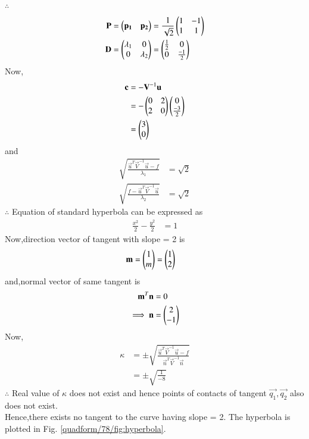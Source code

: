 $\therefore$
\begin{align}
    \mathbf{P} &= \begin{pmatrix}\mathbf{p_1} & \mathbf{p_2}\end{pmatrix} = \frac{1}{\sqrt{2}}\begin{pmatrix}1 & -1 \\ 1 & 1\end{pmatrix}
    \\
    \mathbf{D} &= \begin{pmatrix}\lambda_1 & 0 \\ 0 & \lambda_2\end{pmatrix} = \begin{pmatrix}\frac{1}{2} & 0 \\ 0 & \frac{-1}{2}\end{pmatrix}
\end{align}
Now,
\begin{align}
    \mathbf{c} &= -\mathbf{V}^{-1}\mathbf{u} 
    \\
    &= -\begin{pmatrix}0 & 2 \\2 & 0\end{pmatrix}\begin{pmatrix}0 \\ \frac{-3}{2}\end{pmatrix}
    \\
    &= \begin{pmatrix}3 \\ 0\end{pmatrix}
\end{align}
and
\begin{align}
    \sqrt{\frac{ \vec{u}^T\vec{V}^{-1}\vec{u} - f}{\lambda_1}} &= \sqrt{2}
    \\
    \sqrt{ \frac{f- \vec{u}^T\vec{V}^{-1}\vec{u}}{\lambda_2}} &= \sqrt{2}
\end{align}
$\therefore$ Equation of standard hyperbola can be expressed as 
\begin{align}
    \frac{x^2}{2} - \frac{y^2}{2} &= 1
\end{align}
Now,direction vector of tangent with slope = 2 is
\begin{align}
    \mathbf{m} &= \begin{pmatrix}1 \\ m\end{pmatrix} = \begin{pmatrix}1 \\ 2\end{pmatrix}
\end{align}
and,normal vector of same tangent is 
\begin{align}
    \mathbf{m}^T\mathbf{n} &= 0
    \\
    \implies \mathbf{n} &= \begin{pmatrix}2 \\ -1\end{pmatrix} 
\end{align}
Now,
\begin{align}
    \kappa &= \pm \sqrt{\frac{\vec{u}^T\vec{V}^{-1}\vec{u}-f}{\vec{n}^T\vec{V}^{-1}\vec{n}}}
    \\
    &= \pm \sqrt{\frac{1}{-8}}
\end{align}
$\therefore$ Real value of $\kappa$ does not exist and hence points of contacts of tangent $\vec{q_1},\vec{q_2}$ also does not exist.
\\
Hence,there exists no tangent to the curve having slope = 2.  The hyperbola is plotted in Fig. \ref{quadform/78/fig:hyperbola}.	
%
